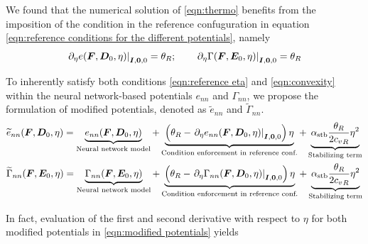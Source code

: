 We found that the numerical solution of \eqref{eqn:thermo} benefits from the imposition of the condition in the reference confuguration in equation \ref{eqn:reference conditions for the different potentials}, namely
%
\begin{equation}\label{eqn:reference eta}
\left.\partial_{\eta}e(\boldsymbol{F},\boldsymbol{D}_0,\eta)\right\vert_{\boldsymbol{I},\boldsymbol{0},0}  =  \theta_R;\qquad 
\left.\partial_{\eta}\Gamma(\boldsymbol{F},\boldsymbol{E}_0,\eta)\right\vert_{\boldsymbol{I},\boldsymbol{0},0}  =  \theta_R
\end{equation}

To inherently satisfy both conditions \eqref{eqn:reference eta} and \eqref{eqn:convexity} within the neural network-based potentials $e_{nn}$ and $\Gamma_{nn}$, we propose the formulation of modified potentials, denoted as $\widetilde{e}_{nn}$ and $\widetilde{\Gamma}_{nn}$.
%
\begin{equation}\label{eqn:modified potentials}
\begin{aligned}
&\widetilde{e}_{nn}(\vect{F},\vect{D}_0,\eta) =  \underbrace{{e}_{nn}(\vect{F},\vect{D}_0,\eta)}_{\text{Neural network model}} + \underbrace{\left(\theta_R-\left.\partial_{\eta}{e}_{nn}(\vect{F},\vect{D}_0,\eta)\right\vert_{\vect{I},\vect{0},0}\right)\eta}_{\text{Condition enforcement in reference conf.}} + \underbrace{\alpha_{\text{stb}}\frac{\theta_R}{2{c_v}_R}\eta^2}_{\text{Stabilizing term}}\\
%
&\widetilde{\Gamma}_{nn}(\vect{F},\vect{E}_0,\eta) =  \underbrace{{\Gamma}_{nn}(\vect{F},\vect{E}_0,\eta)}_{\text{Neural network model}} + \underbrace{\left(\theta_R-\left.\partial_{\eta}{\Gamma}_{nn}(\vect{F},\vect{D}_0,\eta)\right\vert_{\vect{I},\vect{0},0}\right)\eta}_{\text{Condition enforcement in reference conf.}} + \underbrace{\alpha_{\text{stb}}\frac{\theta_R}{2{c_v}_R}\eta^2}_{\text{Stabilizing term}}
%
\end{aligned}
\end{equation}

In fact, evaluation of the first and second derivative with respect to $\eta$ for both modified potentials in \eqref{eqn:modified potentials} yields

